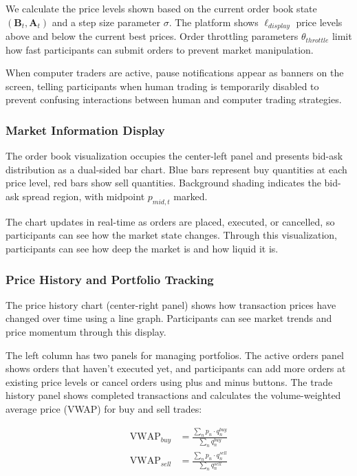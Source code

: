 We calculate the price levels shown based on the current order book state $(\mathbf{B}_t, \mathbf{A}_t)$ and a step size parameter $\sigma$. The platform shows $\ell_{display}$ price levels above and below the current best prices. Order throttling parameters $\theta_{throttle}$ limit how fast participants can submit orders to prevent market manipulation.

When computer traders are active, pause notifications appear as banners on the screen, telling participants when human trading is temporarily disabled to prevent confusing interactions between human and computer trading strategies.

\subsubsection{Market Information Display}

The order book visualization occupies the center-left panel and presents bid-ask distribution as a dual-sided bar chart. Blue bars represent buy quantities at each price level, red bars show sell quantities. Background shading indicates the bid-ask spread region, with midpoint $p_{mid,t}$ marked.

The chart updates in real-time as orders are placed, executed, or cancelled, so participants can see how the market state changes. Through this visualization, participants can see how deep the market is and how liquid it is.

\subsubsection{Price History and Portfolio Tracking}

The price history chart (center-right panel) shows how transaction prices have changed over time using a line graph. Participants can see market trends and price momentum through this display.

The left column has two panels for managing portfolios. The active orders panel shows orders that haven't executed yet, and participants can add more orders at existing price levels or cancel orders using plus and minus buttons. The trade history panel shows completed transactions and calculates the volume-weighted average price (VWAP) for buy and sell trades:

\begin{align}
\text{VWAP}_{buy} &= \frac{\sum_{n} p_n \cdot q_n^{buy}}{\sum_{n} q_n^{buy}} \label{eq:vwap_buy}\\
\text{VWAP}_{sell} &= \frac{\sum_{n} p_n \cdot q_n^{sell}}{\sum_{n} q_n^{sell}} \label{eq:vwap_sell}
\end{align}

